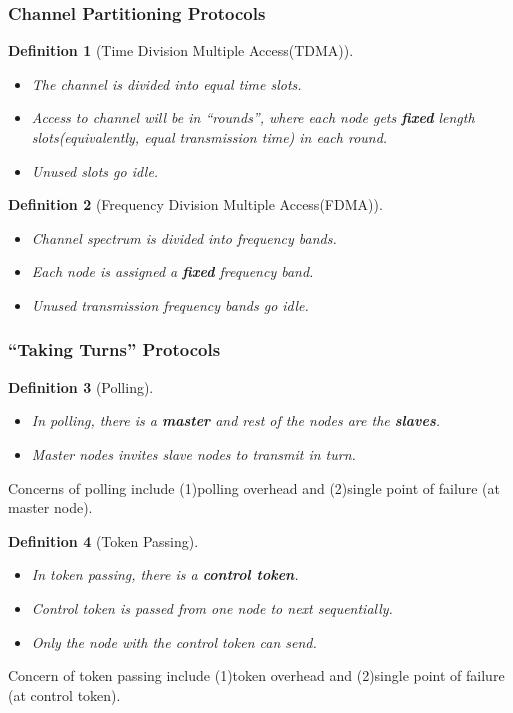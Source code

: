 \documentclass[12pt]{article}
\newtheorem{definition}{Definition}[section]
\theoremstyle{definition}
\begin{document}
\subsubsection{Channel Partitioning Protocols}
\begin{definition}[Time Division Multiple Access(TDMA)]
\hfill\\\normalfont 
\begin{itemize}
\item The channel is divided into equal time slots.
\item Access to channel will be in ``rounds'', where each node gets \textbf{fixed} length slots(equivalently, equal transmission time) in each round.
\item Unused slots go idle.
\end{itemize}
\end{definition}
\begin{definition}[Frequency Division Multiple Access(FDMA)]
\hfill\\\normalfont 
\begin{itemize}
\item Channel spectrum is divided into frequency bands.
\item Each node is assigned a \textbf{fixed} frequency band.
\item Unused transmission frequency bands go idle.
\end{itemize}
\end{definition}
\subsubsection{``Taking Turns'' Protocols}
\begin{definition}[Polling]
\hfill\\\normalfont
\begin{itemize}
\item In polling, there is a \textbf{master} and rest of the nodes are the \textbf{slaves}.
\item Master nodes invites slave nodes to transmit in turn.
\end{itemize}
\end{definition}
Concerns of polling include (1)polling overhead and (2)single point of failure (at master node).
\begin{definition}[Token Passing]
\hfill\\\normalfont \begin{itemize}
\item In token passing, there is a \textbf{control token}. 
\item Control token is passed from one node to next sequentially.
\item Only the node with the control token can send. \end{itemize}
\end{definition}
Concern of token passing include (1)token overhead and (2)single point of failure (at control token).
\end{document}
